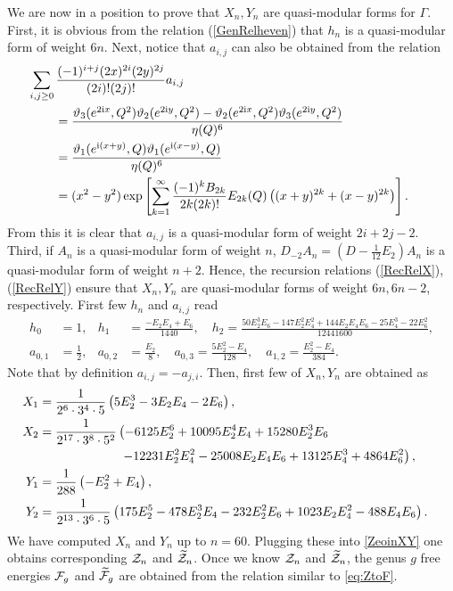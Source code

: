 \documentclass[11pt]{article}
\newcommand{\ri}{{\rm i}}
\newcommand{\nn}{\nonumber}
\renewcommand{\[}{\begin{eqnarray}}
\renewcommand{\]}{\end{eqnarray}}
\newcommand{\varth}{\vartheta}
\newcommand{\Zeven}{{\cal Z}}
\newcommand{\Zodd}{{\widetilde{\cal Z}}}
\newcommand{\Feven}{{\cal F}}
\newcommand{\Fodd}{{\widetilde{\cal F}}}
\newcommand{\heven}{h}
\begin{document}
We are now in a position to prove that $X_n,Y_n$ are quasi-modular forms
for $\Gamma$.
First, it is obvious from the relation (\ref{GenRelheven})
that $\heven_n$ is a quasi-modular form of weight $6n$. 
Next, notice that $a_{i,j}$ can also be obtained from the relation
%
\begin{align}
\begin{aligned}
&\hspace{-2em}
\lefteqn{
 \sum_{i,j\ge 0}\frac{(-1)^{i+j}(2x)^{2i}(2y)^{2j}}{(2i)!(2j)!}a_{i,j}
        }\\
 &=\frac{\varth_3(e^{2\ri x},Q^2)\varth_2(e^{2\ri y},Q^2)
        -\varth_2(e^{2\ri x},Q^2)\varth_3(e^{2\ri y},Q^2)}{\eta(Q)^6}\\
 &=\frac{\varth_1(e^{\ri(x+y)},Q)\varth_1(e^{\ri(x-y)},Q)}{\eta(Q)^6}\\
 &=(x^2-y^2)\exp\left[\sum_{k=1}^\infty
  \frac{(-1)^kB_{2k}}{2k(2k)!}E_{2k}(Q)
  \left((x+y)^{2k}+(x-y)^{2k}\right)\right].
\end{aligned}
\end{align}
%
From this it is clear that $a_{i,j}$ is a quasi-modular form
of weight $2i+2j-2$.
Third, if $A_n$ is a quasi-modular form of weight $n$,
$D_{-2}A_n=(D-\frac{1}{12}E_2)A_n$ is a quasi-modular form
of weight $n+2$.
Hence, the recursion relations (\ref{RecRelX}), (\ref{RecRelY})
ensure that $X_n,Y_n$ are quasi-modular forms of weight $6n,6n-2$,
respectively.
First few $\heven_n$ and $a_{i,j}$ read
%
\begin{align}
h_0&=1,&
h_1&=\frac{-E_2E_4+E_6}{1440},\quad
h_2=\frac{50E_2^3E_6-147E_2^2E_4^2+144E_2E_4E_6-25E_4^3-22E_6^2}{12441600},\\
a_{0,1}&=\frac{1}{2},&
a_{0,2}&=\frac{E_2}{8},\quad
a_{0,3}=\frac{5E_2^2-E_4}{128},\quad
a_{1,2}=\frac{E_2^2-E_4}{384}.
\end{align}
%
Note that by definition $a_{i,j}=-a_{j,i}$.
Then, first few of $X_n,Y_n$ are obtained as
%
\begin{align}
X_1&=\frac{1}{2^6\cdot 3^4\cdot 5}
 \left(5E_2^3-3E_2E_4-2E_6\right),\nn\\
X_2&=\frac{1}{2^{17}\cdot 3^8\cdot 5^2}
 \left(-6125E_2^6+10095E_2^4E_4+15280E_2^3E_6\right.\nn\\
 &\hspace{6.5em}\left.
  -12231E_2^2E_4^2-25008E_2E_4E_6+13125E_4^3+4864E_6^2\right),\\
Y_1&=\frac{1}{288}\left(-E_2^2+E_4\right),\nn\\
Y_2&=\frac{1}{2^{13}\cdot 3^6\cdot 5}
 \left(175E_2^5-478E_2^3E_4-232E_2^2E_6+1023E_2E_4^2-488E_4E_6\right).
\quad
\end{align}
%
We have computed $X_n$ and $Y_n$ up to $n=60$.
Plugging these into \eqref{ZeoinXY}
one obtains corresponding $\Zeven_n$ and $\Zodd_n$.
Once we know $\Zeven_n$ and $\Zodd_n$, the genus $g$ free energies 
$\Feven_g$ and $\Fodd_g$ are obtained
from the relation similar to \eqref{eq:ZtoF}.
\end{document}
